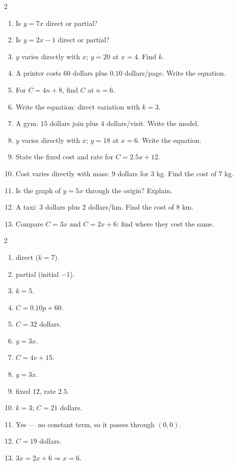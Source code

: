 \documentclass[11pt]{article}
\begin{document}
\begin{recapbox}
\begin{multicols}{2}
\small
\begin{enumerate}[leftmargin=*,itemsep=3pt]
  \item Is $y=7x$ direct or partial?
  \item Is $y=2x-1$ direct or partial?
  \item $y$ varies directly with $x$; $y=20$ at $x=4$. Find $k$.
  \item A printer costs $60$ dollars plus $0.10$ dollars/page. Write the equation.
  \item For $C=4n+8$, find $C$ at $n=6$.
  \item Write the equation: direct variation with $k=3$.
  \item A gym: $15$ dollars join plus $4$ dollars/visit. Write the model.
  \item $y$ varies directly with $x$; $y=18$ at $x=6$. Write the equation.
  \item State the fixed cost and rate for $C=2.5x+12$.
  \item Cost varies directly with mass: $9$ dollars for $3$ kg. Find the cost of $7$ kg.
  \item Is the graph of $y=5x$ through the origin? Explain.
  \item A taxi: $3$ dollars plus $2$ dollars/km. Find the cost of $8$ km.
  \item Compare $C=3x$ and $C=2x+6$: find where they cost the same.
\end{enumerate}
\end{multicols}
\end{recapbox}

\begin{keybox}
\begin{multicols}{2}
\small
\begin{enumerate}[leftmargin=*,itemsep=3pt]
  \item direct ($k=7$).
  \item partial (initial $-1$).
  \item $k=5$.
  \item $C=0.10p+60$.
  \item $C=32$ dollars.
  \item $y=3x$.
  \item $C=4v+15$.
  \item $y=3x$.
  \item fixed $12$, rate $2.5$.
  \item $k=3$; $C=21$ dollars.
  \item Yes — no constant term, so it passes through $(0,0)$.
  \item $C=19$ dollars.
  \item $3x=2x+6\Rightarrow x=6$.
\end{enumerate}
\end{multicols}
\end{keybox}
\end{document}
